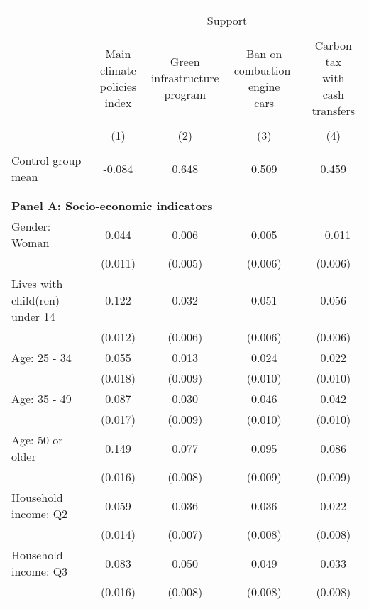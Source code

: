 
\begin{tabular}{@{\extracolsep{5pt}}lcccc} 
\\[-1.8ex]\hline 
\hline \\[-1.8ex] 
 & \multicolumn{4}{c}{Support} \\ 
\cline{2-5} 
\\[-1.8ex] & \makecell{Main climate\\policies index} & \makecell{Green\\infrastructure\\program} & \makecell{Ban on\\combustion-engine\\cars} & \makecell{Carbon tax\\with\\cash transfers} \\ 
\\[-1.8ex] & (1) & (2) & (3) & (4)\\ 
\hline \\[-1.8ex] 
Control group mean & -0.084 & 0.648 & 0.509 & 0.459  \\ \hline \\[-1.8ex]
\\[1ex]
\multicolumn{ 5 }{l}{\textbf{ Panel A: Socio-economic indicators }} \\
 Gender: Woman & 0.044 & 0.006 & 0.005 & $-$0.011 \\ 
  & (0.011) & (0.005) & (0.006) & (0.006) \\ 
  Lives with child(ren) under 14 & 0.122 & 0.032 & 0.051 & 0.056 \\ 
  & (0.012) & (0.006) & (0.006) & (0.006) \\ 
  Age: 25 - 34 & 0.055 & 0.013 & 0.024 & 0.022 \\ 
  & (0.018) & (0.009) & (0.010) & (0.010) \\ 
  Age: 35 - 49 & 0.087 & 0.030 & 0.046 & 0.042 \\ 
  & (0.017) & (0.009) & (0.010) & (0.010) \\ 
  Age: 50 or older & 0.149 & 0.077 & 0.095 & 0.086 \\ 
  & (0.016) & (0.008) & (0.009) & (0.009) \\ 
  Household income: Q2 & 0.059 & 0.036 & 0.036 & 0.022 \\ 
  & (0.014) & (0.007) & (0.008) & (0.008) \\ 
  Household income: Q3 & 0.083 & 0.050 & 0.049 & 0.033 \\ 
  & (0.016) & (0.008) & (0.008) & (0.008) \\ 

\end{tabular}
